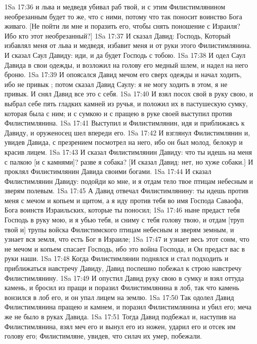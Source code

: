 \vs 1Sa 17:36 и льва и медведя убивал раб твой, и с этим Филистимлянином необрезанным будет то же, что с ними, потому что так поносит воинство Бога живаго. [Не пойти ли мне и поразить его, чтобы снять поношение с Израиля? Ибо кто этот необрезанный?]
\vs 1Sa 17:37 И сказал Давид: Господь, Который избавлял меня от льва и медведя, избавит меня и от руки этого Филистимлянина. И сказал Саул Давиду: иди, и да будет Господь с тобою.
\vs 1Sa 17:38 И одел Саул Давида в свои одежды, и возложил на голову его медный шлем, и надел на него броню.
\vs 1Sa 17:39 И опоясался Давид мечом его сверх одежды и начал ходить, ибо не привык ; потом сказал Давид Саулу: я не могу ходить в этом, я не привык. И снял Давид все это с себя.
\vs 1Sa 17:40 И взял посох свой в руку свою, и выбрал себе пять гладких камней из ручья, и положил их в пастушескую сумку, которая была с ним; и с сумкою и с пращею в руке своей выступил против Филистимлянина.
\vs 1Sa 17:41 Выступил и Филистимлянин, идя и приближаясь к Давиду, и оруженосец шел впереди его.
\vs 1Sa 17:42 И взглянул Филистимлянин и, увидев Давида, с презрением посмотрел на него, ибо он был молод, белокур и красив лицем.
\vs 1Sa 17:43 И сказал Филистимлянин Давиду: что ты идешь на меня с палкою [и с камнями]? разве я собака? [И сказал Давид: нет, но хуже собаки.] И проклял Филистимлянин Давида своими богами.
\vs 1Sa 17:44 И сказал Филистимлянин Давиду: подойди ко мне, и я отдам тело твое птицам небесным и зверям полевым.
\vs 1Sa 17:45 А Давид отвечал Филистимлянину: ты идешь против меня с мечом и копьем и щитом, а я иду против тебя во имя Господа Саваофа, Бога воинств Израильских, которые ты поносил;
\vs 1Sa 17:46 ныне предаст тебя Господь в руку мою, и я убью тебя, и сниму с тебя голову твою, и отдам [труп твой и] трупы войска Филистимского птицам небесным и зверям земным, и узнает вся земля, что есть Бог в Израиле;
\vs 1Sa 17:47 и узнает весь этот сонм, что не мечом и копьем спасает Господь, ибо это война Господа, и Он предаст вас в руки наши.
\vs 1Sa 17:48 Когда Филистимлянин поднялся и стал подходить и приближаться навстречу Давиду, Давид поспешно побежал к строю навстречу Филистимлянину.
\vs 1Sa 17:49 И опустил Давид руку свою в сумку и взял оттуда камень, и бросил из пращи и поразил Филистимлянина в лоб, так что камень вонзился в лоб его, и он упал лицем на землю.
\vs 1Sa 17:50 Так одолел Давид Филистимлянина пращею и камнем, и поразил Филистимлянина и убил его; меча же не было в руках Давида.
\vs 1Sa 17:51 Тогда Давид подбежал и, наступив на Филистимлянина, взял меч его и вынул его из ножен, ударил его и отсек им голову его; Филистимляне, увидев, что силач их умер, побежали.
